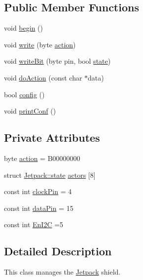 \subsection*{Public Member Functions}
\begin{DoxyCompactItemize}
\item 
void \hyperlink{classJetpack_a5a53e1ebf7aaf3bf3e0d37ea64ca09a7}{begin} ()
\item 
void \hyperlink{classJetpack_a338f1af8cbc6504ac69b47c7328569b5}{write} (byte \hyperlink{classJetpack_aca3142925a7b0834b34ae91d26af7765}{action})
\item 
void \hyperlink{classJetpack_a79ae7bc3c1828a0551a7c005c4f8bd00}{write\+Bit} (byte pin, bool \hyperlink{structJetpack_1_1state}{state})
\item 
void \hyperlink{classJetpack_a9e703197093094b963f9ad57817495b8}{do\+Action} (const char $\ast$data)
\item 
bool \hyperlink{classJetpack_ab065ee83e244265a2223a22f3ee4a719}{config} ()
\item 
void \hyperlink{classJetpack_ac54a7bb4f9166bee32052253d9b1d306}{print\+Conf} ()
\end{DoxyCompactItemize}
\subsection*{Private Attributes}
\begin{DoxyCompactItemize}
\item 
byte \hyperlink{classJetpack_aca3142925a7b0834b34ae91d26af7765}{action} = B00000000
\item 
struct \hyperlink{structJetpack_1_1state}{Jetpack\+::state} \hyperlink{classJetpack_a7e16d2f97837f9712a2e6de1c50d99db}{actors} \mbox{[}8\mbox{]}
\item 
const int \hyperlink{classJetpack_a58ebb991f358f3ae94e82148b0221b5a}{clock\+Pin} = 4
\item 
const int \hyperlink{classJetpack_a3d669a56e93c71dd25f970d4ed7d0c00}{data\+Pin} = 15
\item 
const int \hyperlink{classJetpack_a81df984fb4cea98c71aa1a1cfcdfe814}{En\+I2C} =5
\end{DoxyCompactItemize}


\subsection{Detailed Description}
This class manages the \hyperlink{classJetpack}{Jetpack} shield. 

